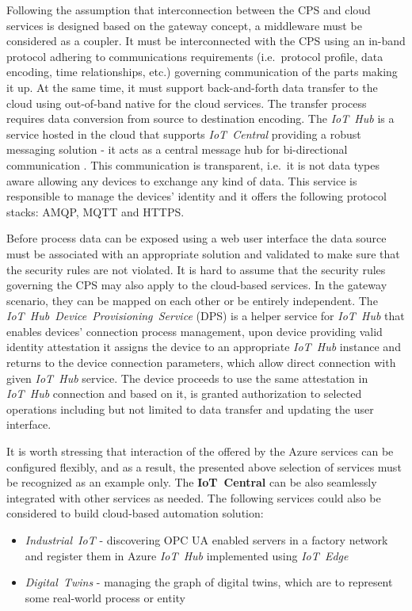 \documentclass{article}
\begin{document}
Following the assumption that interconnection between the CPS and cloud services is designed based on the gateway concept, a middleware must be considered as a coupler. It must be interconnected with the CPS using an in-band protocol adhering to communications requirements (i.e.~protocol profile, data encoding, time relationships, etc.) governing communication of the parts making it up. At the same time, it must support back-and-forth data transfer to the cloud using out-of-band native for the cloud services. The transfer process requires data conversion from source to destination encoding. The \textit{IoT\ Hub} is a service hosted in the cloud that supports \textit{IoT\ Central} providing a robust messaging solution - it acts as a central message hub for bi-directional communication . This communication is transparent, i.e.~it is not data types aware allowing
any devices to exchange any kind of data. This service is responsible to manage the devices' identity and it offers the following protocol stacks: AMQP, MQTT and HTTPS.

Before process data can be exposed using a web user interface the data source must be associated with an appropriate solution and validated to make sure that the security rules are not violated. It is hard to assume that the security rules governing the CPS may also apply to the cloud-based services. In the gateway scenario, they can be mapped on each other or be entirely independent. The \textit{IoT\ Hub\ Device\ Provisioning\ Service} (DPS) is a helper service for \textit{IoT\ Hub} that enables devices' connection process management, upon device providing valid identity attestation it assigns the device to an appropriate \textit{IoT\ Hub} instance and returns to the device connection parameters, which allow direct connection with given \textit{IoT\ Hub} service. The device proceeds to use the same attestation in \textit{IoT\ Hub} connection and based on it, is granted authorization to selected operations including but not limited to data transfer and updating the user interface.

It is worth stressing that interaction of the offered by the Azure
services can be configured flexibly, and as a result, the presented
above selection of services must be recognized as an example only. The
\textbf{IoT\ Central} can be also seamlessly integrated with other
services as needed. The following services could also be considered to
build cloud-based automation solution:

\begin{itemize}
      \item \textit{Industrial\ IoT} - discovering OPC UA enabled servers in a factory network and register them in Azure \textit{IoT\ Hub} implemented using \textit{IoT\ Edge}
      \item \textit{Digital\ Twins} - managing the graph of digital twins, which are to represent some real-world process or entity
\end{itemize}
\end{document}
